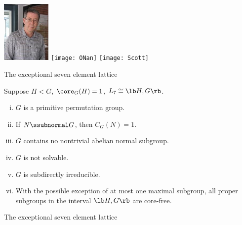 \begin{frame}[fragile,label=AOS]{}
\begin{center}
\includegraphics[height=30mm]{aux/Aschbacher3}
\hskip2mm
\texttt{[image: ONan]}
\hskip2mm
\texttt{[image: Scott]}
 \end{center}

\end{frame}



\begin{frame}[fragile,label=Example7elementPreziOld,shrink=5]{The exceptional seven element lattice}
    \begin{prop}
      \label{thm:except-seven-elem}
      Suppose $H<G$, \hskip2mm $\core_G(H) = 1$, \hskip2mm $L_7 \cong \lb H,G \rb$.
      \begin{enumerate}[(i)]
      \item<1-> $G$ is a primitive permutation group.
      \item<1-> If $N\ssubnormal G$, then $C_G(N) = 1$.
      \item<1-> $G$ contains no nontrivial abelian normal subgroup.
      \item<1-> $G$ is not solvable.
      \item<1-> $G$ is subdirectly irreducible.
      \item<1-> With the possible exception of at most one maximal subgroup, %
        all proper subgroups in the interval $\lb H,G \rb$ are core-free. 
      \end{enumerate}
    \end{prop}
\end{frame}


\begin{frame}[fragile,label=Example7elementPreziBigFig]{The exceptional seven element lattice}
      \begin{center}
    {
}
      \end{center}
\end{frame}

